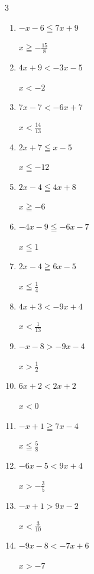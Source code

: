 \begin{multicols}{3}
\begin{enumerate}
  \item $-x-6\leqq 7x+9$

        $\displaystyle x\geqq -\frac{15}{8}$

  \item $4x+9<-3x-5$

        $\displaystyle x<-2$

  \item $7x-7<-6x+7$

        $\displaystyle x<\frac{14}{13}$

  \item $2x+7\leqq x-5$

        $\displaystyle x\leqq -12$

  \item $2x-4\leqq 4x+8$

        $\displaystyle x\geqq -6$

  \item $-4x-9\leqq -6x-7$

        $\displaystyle x\leqq 1$

\columnbreak %

\resetques

  \item $2x-4\geqq 6x-5$

        $\displaystyle x\leqq \frac{1}{4}$

  \item $4x+3<-9x+4$

        $\displaystyle x<\frac{1}{13}$

  \item $-x-8>-9x-4$

        $\displaystyle x>\frac{1}{2}$

  \item $6x+2<2x+2$

        $\displaystyle x<0$

  \item $-x+1\geqq 7x-4$

        $\displaystyle x\leqq \frac{5}{8}$

  \item $-6x-5<9x+4$

        $\displaystyle x>-\frac{3}{5}$

  \item $-x+1>9x-2$

        $\displaystyle x<\frac{3}{10}$

  \item $-9x-8<-7x+6$

        $\displaystyle x>-7$


\end{enumerate}
\end{multicols}
